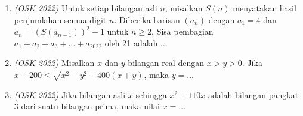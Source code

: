 \documentclass[11pt]{scrartcl}
\begin{document}
\begin{enumerate}
    \item \textit{(OSK 2022)} Untuk setiap bilangan asli $n$, misalkan $S(n)$ menyatakan hasil penjumlahan semua digit $n$. Diberika barisan $(a_n)$ dengan $a_1=4$ dan $a_n=(S(a_{n-1}))^2-1$ untuk $n\geq 2$. Sisa pembagian $a_1+a_2+a_3+\dots+a_{2022}$ oleh 21 adalah $\dots$
    
    \item \textit{(OSK 2022)} Misalkan $x$ dan $y$ bilangan real dengan $x>y>0$. Jika $x+200\leq \sqrt{x^2-y^2+400(x+y)}$, maka $y=\dots$
    
    \item \textit{(OSK 2022)} Jika bilangan asli $x$ sehingga $x^2 + 110x$ adalah bilangan pangkat 3 dari suatu bilangan prima, maka nilai  $x=\dots$ 
\end{enumerate}
\end{document}
